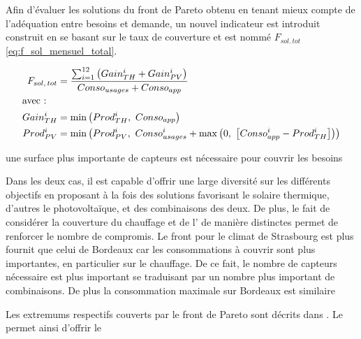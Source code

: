 Afin d’évaluer les solutions du front de Pareto obtenu en tenant mieux compte de
l’adéquation entre besoins et demande, un nouvel indicateur est introduit construit
en se basant sur le taux de couverture et est nommé $F_{sol.\, tot}$ \eqref{eq:f_sol_mensuel_total}.


\begin{align}\label{eq:f_sol_mensuel_total}
        F_{sol,\, tot} &= \frac{\sum_{i=1}^{12}\left(Gain_{TH}^{i} + Gain_{PV}^{i} \right)}{Conso_{usages} + Conso_{app}} \\
        \shortintertext{avec~:}
        Gain_{TH}^{i} &= \min \left(Prod_{TH}^{i},\ Conso_{app} \right) \\
        Prod_{PV}^{i} &= \min \left(Prod_{PV}^{i},\ Conso_{usages}^{i} + \max\left(0,\ \left[Conso_{app}^{i} - Prod_{TH}^{i} \right]\right) \right) \\
\end{align}

une surface plus importante de capteurs  est nécessaire pour couvrir les besoins


Dans les
deux cas, il est capable d’offrir une large diversité sur les différents objectifs en
proposant à la fois des solutions favorisant le solaire thermique, d’autres le
photovoltaïque, et des combinaisons des deux. De plus, le fait de considérer la couverture
du chauffage et de l’ de manière distinctes permet de renforcer le nombre de
compromis. Le front pour le climat de Strasbourg est plus fournit que celui de Bordeaux
car les consommations à couvrir sont plus importantes, en particulier sur le chauffage.
De ce fait, le nombre de capteurs  nécessaire est plus important se traduisant par
un nombre plus important de combinaisons.
De plus la consommation maximale sur
Bordeaux est similaire


Les extremums respectifs couverts par le front de Pareto sont décrits dans .
Le  permet ainsi d’offrir le

